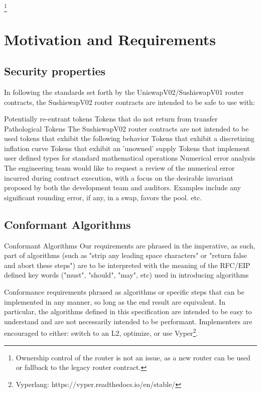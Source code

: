 \documentclass[runningheads]{llncs}
\begin{document}
\footnote{Ownership control of the router is not an issue, as a new router can be used or fallback to the legacy router contract.}


\newpage
\section{Motivation and Requirements}

\subsection{Security properties}

In following the standards set forth by the UniswapV02/SushiswapV01 router contracts, the SushiswapV02 router contracts are intended to be safe to use with:

Potentially re-entrant tokens
Tokens that do not return from transfer
Pathological Tokens The SushiswapV02 router contracts are not intended to be used tokens that exhibit the following behavior
Tokens that exhibit a discretizing inflation curve
Tokens that exhibit an 'unowned' supply
Tokens that implement user defined types for standard mathematical operations
Numerical error analysis The engineering team would like to request a review of the numerical error incurred during contract execution, with a focus on the desirable invariant proposed by both the development team and auditors. Examples include any significant rounding error, if any, in a swap, favors the pool. etc.


\subsection{Conformant Algorithms}	

Conformant Algorithms
Our requirements are phrased in the imperative, as such, part of algorithms (such as "strip any leading space characters" or "return false and abort these steps") are to be interpreted with the meaning of the RFC/EIP defined key words ("must", "should", "may", etc) used in introducing algorithms

\hfill \break

Conformance requirements phrased as algorithms or specific steps that can be implemented in any manner, so long as the end result are equivalent. In particular, the algorithms defined in this specification are intended to be easy to understand and are not necessarily intended to be performant. Implementers are encouraged to either: switch to an L2, optimize, or use Vyper\footnote{Vyperlang: https://vyper.readthedocs.io/en/stable/}.
\end{document}
